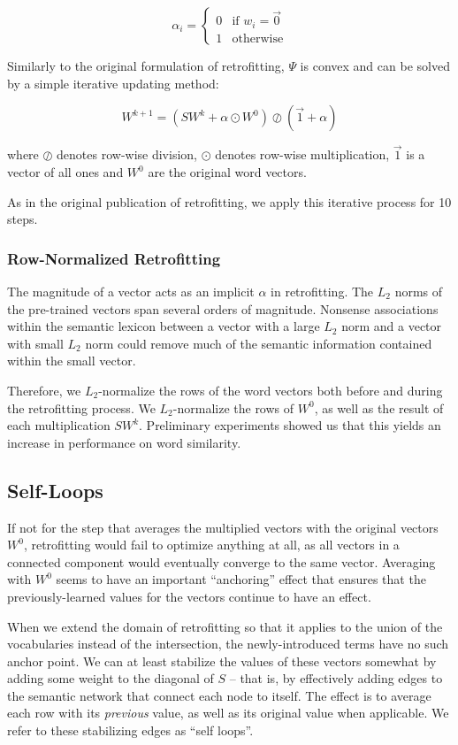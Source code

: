 \documentclass[11pt,letterpaper]{article}
\begin{document}
$$
\alpha_i =
  \begin{cases}
    0 & \text{if $w_i = \vec{0}$} \\
    1 & \text{otherwise}
  \end{cases}
$$

Similarly to the original formulation of retrofitting, $\Psi$ is convex and can
be solved by a simple iterative updating method:

$$
W^{k+1} = \left( S W^k + \alpha \odot W^0 \right)
\oslash \left( \vec{1} + \alpha \right)
$$

where $\oslash$ denotes row-wise division, $\odot$ denotes row-wise
multiplication, $\vec{1}$ is a vector of all ones and $W^0$ are the original
word vectors.

As in the original publication of retrofitting, we apply this iterative process
for 10 steps.

\subsubsection{Row-Normalized Retrofitting}

The magnitude of a vector acts as an implicit $\alpha$ in retrofitting.
The $L_2$ norms of the pre-trained vectors span several orders of magnitude.
Nonsense associations within the semantic lexicon between a vector with a large
$L_2$ norm and a vector with small $L_2$ norm could remove much of the semantic
information contained within the small vector.

Therefore, we $L_2$-normalize
the rows of the word vectors both before and during the retrofitting process.
We $L_2$-normalize the rows of $W^0$, as well as the result of each
multiplication $S W^k$. Preliminary experiments showed us that this yields
an increase in performance on word similarity.

\subsection{Self-Loops}
If not for the step that averages the multiplied vectors with the original
vectors $W^0$, retrofitting would fail to optimize anything at all, as all
vectors in a connected component would eventually converge to the same vector.
Averaging with $W^0$ seems to have an important ``anchoring'' effect that
ensures that the previously-learned values for the vectors continue to have
an effect.

When we extend the domain of retrofitting so that it applies to the union of
the vocabularies instead of the intersection, the newly-introduced terms have
no such anchor point. We can at least stabilize the values of these vectors
somewhat by adding some weight to the diagonal of $S$ -- that is, by
effectively adding edges to the semantic network that connect each node to
itself. The effect is to average each row with its {\em previous} value, as
well as its original value when applicable. We refer to these stabilizing edges
as ``self loops''.
\end{document}
